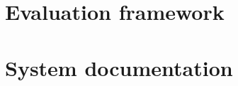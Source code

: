 \section{Evaluation framework}
\label{sec:evaluationFramework}


\section{System documentation}
\label{sec:systemDocumentation}




\cleardoublepage
